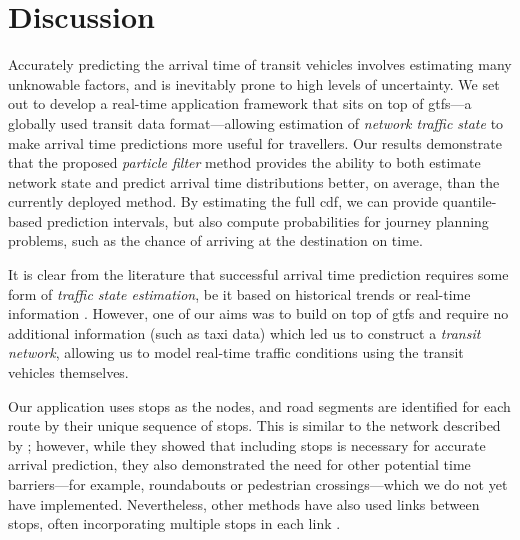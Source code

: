 \chapter{Discussion}
\label{cha:discussion}


Accurately predicting the arrival time of transit vehicles involves estimating many unknowable factors, and is inevitably prone to high levels of uncertainty. We set out to develop a real-time application framework that sits on top of \gls{gtfs}---a globally used transit data format---allowing estimation of \emph{network traffic state} to make arrival time predictions more useful for travellers. Our results demonstrate that the proposed \emph{particle filter} method provides the ability to both estimate network state and predict arrival time distributions better, on average, than the currently deployed method. By estimating the full \gls{cdf}, we can provide quantile-based prediction intervals, but also compute probabilities for journey planning problems, such as the chance of arriving at the destination on time.


It is clear from the literature that successful arrival time prediction requires some form of \emph{traffic state estimation}, be it based on historical trends \citep{Julio_2016,Cathey_2003,Celan_2017,Mazloumi_2012} or real-time information \citep{Ma_2019,Xinghao_2013,Shalaby_2004}. However, one of our aims was to build on top of \gls{gtfs} and require no additional information (such as taxi data) which led us to construct a \emph{transit network}, allowing us to model real-time traffic conditions using the transit vehicles themselves.


Our application uses stops as the nodes, and road segments are identified for each route by their unique sequence of stops. This is similar to the network described by \citet{Celan_2018, Celan_2017}; however, while they showed that including stops is necessary for accurate arrival prediction, they also demonstrated the need for other potential time barriers---for example, roundabouts or pedestrian crossings---which we do not yet have implemented. Nevertheless, other methods have also used links between stops, often incorporating multiple stops in each link \citep{Shalaby_2004}.


